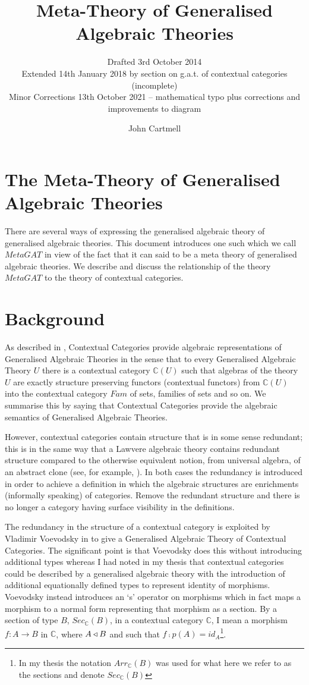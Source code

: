 \documentclass[10pt,a4paper]{scrartcl}
\title{Meta-Theory of Generalised Algebraic Theories}
\subtitle{\small{Drafted  3rd October 2014 \\
          Extended 14th January 2018 by section on g.a.t. of contextual categories (incomplete)\\
					Minor Corrections 13th October 2021 -- mathematical typo plus corrections and improvements to diagram}}
\date{}
\author{John Cartmell}
\begin{document}
\maketitle
\section{The Meta-Theory of Generalised Algebraic Theories}
There are several ways of expressing the generalised algebraic 
theory of generalised algebraic theories.  This document introduces one such  
which we call $MetaGAT$ in view of the fact that it can said to be a meta theory of generalised algebraic theories. We describe and discuss the relationship of the theory $MetaGAT$ to the theory of contextual categories.  

\section{Background}
As described in \cite{Cartmell86}, Contextual Categories provide algebraic representations of Generalised Algebraic Theories  in the sense that to every Generalised Algebraic Theory $U$ there is a contextual category $\mathbb{C}(U)$ such that algebras of the theory $U$ are exactly structure preserving functors (contextual functors)  from $\mathbb{C}(U)$ into the contextual category $Fam$ of sets, families of sets and so on. We summarise this by saying that Contextual Categories provide the algebraic semantics of Generalised Algebraic Theories. 

However, contextual categories contain structure that is in some sense redundant; this is in the same way that a Lawvere algebraic theory contains redundant structure compared to the otherwise equivalent notion, from universal algebra, of an abstract clone (see, for example, \cite{KerkoffonClones}). In both cases the redundancy is introduced in order to achieve a definition in which the algebraic structures 
 are enrichments (informally speaking) of categories. Remove the redundant structure and there is no longer a category having surface visibility in the definitions. 

The redundancy in the structure of a contextual category is exploited by Vladimir Voevodsky in \cite{Voevodsky14C} to give a Generalised Algebraic Theory of Contextual Categories. The significant point is that Voevodsky does this without introducing additional types whereas I had noted in my thesis \cite{Cartmell78} that contextual categories could be described by a generalised algebraic theory with the introduction of additional equationally defined types to represent identity of morphisms. Voevodsky instead introduces an  `s' operator on morphisms which in fact maps a morphism to a normal form representing that morphism as a section. By a section of type $B$, $Sec_{\mathbb{C}}(B)$, in a contextual category $\mathbb{C}$, I mean a morphism $f:A\rightarrow B$ in $\mathbb{C}$, where 
$A \triangleleft B$ and such that $f \comp p(A) = id_A$\footnote{In my thesis the notation $Arr_{\mathbb{C}}(B)$ was used for what here we refer to as the sections and denote $Sec_{\mathbb{C}}(B)$}.
\end{document}
